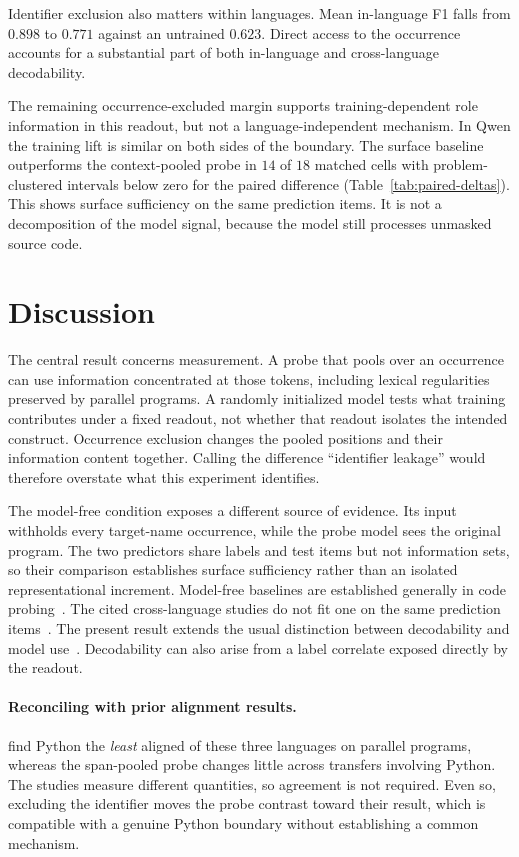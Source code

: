 \documentclass{article}
\begin{document}
Identifier exclusion also matters within languages. Mean in-language F1 falls
from $0.898$ to $0.771$ against an untrained $0.623$. Direct access to the
occurrence accounts for a substantial part of both in-language and
cross-language decodability.

The remaining occurrence-excluded margin supports training-dependent role
information in this readout, but not a language-independent mechanism. In
Qwen the training lift is similar on both sides of the boundary.
The surface baseline outperforms the context-pooled probe in $14$ of $18$
matched cells with problem-clustered intervals below zero for the paired
difference (Table~\ref{tab:paired-deltas}). This shows surface sufficiency on
the same prediction items. It is not a decomposition of
the model signal, because the model still processes unmasked source code.

\section{Discussion}

The central result concerns measurement. A probe that pools over an occurrence
can use information concentrated at those tokens, including lexical
regularities preserved by parallel programs. A randomly initialized model
tests what training contributes under a fixed readout, not whether that readout
isolates the intended construct. Occurrence exclusion changes the pooled
positions and their information content together. Calling the difference
``identifier leakage'' would therefore overstate what this experiment
identifies.

The model-free condition exposes a different source of evidence. Its input
withholds every target-name occurrence, while the probe model sees the original
program. The two predictors share labels and test items but not information
sets, so their comparison establishes surface sufficiency rather than an
isolated representational increment.
Model-free baselines are established generally in code
probing~\citep{troshin2022probing}. The cited cross-language studies do not fit
one on the same prediction
items~\citep{hernandezlopez2026syntactic,utpala2024language,kargaran2025programming}.
The present result extends the usual distinction between decodability and model
use~\citep{elazar2021amnesic,belinkov2022probing}. Decodability can also arise from a
label correlate exposed directly by the readout.

\paragraph{Reconciling with prior alignment results.}
\citet{kargaran2025programming} find Python the \emph{least} aligned of these
three languages on parallel programs, whereas the span-pooled probe changes
little across transfers involving Python. The studies measure different
quantities, so agreement is not required. Even so, excluding the identifier
moves the probe contrast toward their result, which is compatible with a
genuine Python boundary without establishing a common mechanism.
\end{document}
